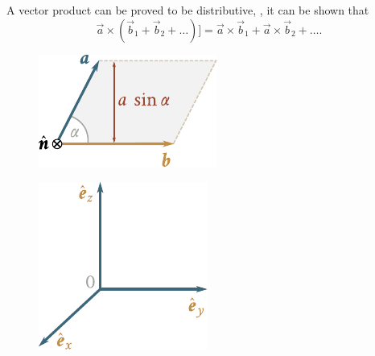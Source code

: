 \noindent
A vector product can be proved to be distributive, \ie, it can be shown that
\begin{equation}\label{eq:1_30}
\vec{a}\times(\vec{b}_1+\vec{b}_2+\ldots)] = \vec{a}\times\vec{b}_1 + \vec{a}\times\vec{b}_2 + \ldots.
\end{equation}

\begin{figure}[t]
	\begin{minipage}[t]{0.5\linewidth}
		\begin{center}
			\includegraphics[scale=1]{figures/ch_01/fig_1_16.pdf}
			\caption[]{}
			\label{fig:1_16}
		\end{center}
	\end{minipage}
	\hfill{ }%
	\begin{minipage}[t]{0.5\linewidth}
		\begin{center}
			\includegraphics[scale=1]{figures/ch_01/fig_1_17.pdf}
			\caption[]{}
			\label{fig:1_17}
		\end{center}
	\end{minipage}
	\vspace{-0.3cm}
\end{figure}

